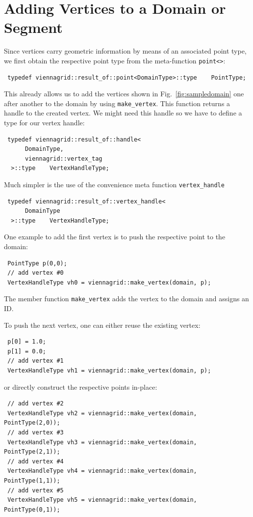 \pagebreak

\section{Adding Vertices to a Domain or Segment}
Since vertices carry geometric information by means of an associated point type, we first obtain the respective point type from the meta-function \lstinline|point<>|:
\begin{lstlisting}
 typedef viennagrid::result_of::point<DomainType>::type    PointType;
\end{lstlisting}
This already allows us to add the vertices shown in Fig.~\ref{fig:sampledomain} one after another to the domain by using \lstinline|make_vertex|. This function returns a handle to the created vertex. We might need this handle so we have to define a type for our vertex handle:
\begin{lstlisting}
 typedef viennagrid::result_of::handle<
      DomainType,
      viennagrid::vertex_tag
  >::type    VertexHandleType;
\end{lstlisting}
Much simpler is the use of the convenience meta function \lstinline|vertex_handle|
\begin{lstlisting}
 typedef viennagrid::result_of::vertex_handle<
      DomainType
  >::type    VertexHandleType;
\end{lstlisting}
One example to add the first vertex is to push the respective point to the domain:
\begin{lstlisting}
 PointType p(0,0);
 // add vertex #0
 VertexHandleType vh0 = viennagrid::make_vertex(domain, p);
\end{lstlisting}
The member function \lstinline|make_vertex| adds the vertex to the domain and assigns an ID.

To push the next vertex, one can either reuse the existing vertex:
\begin{lstlisting}
 p[0] = 1.0;
 p[1] = 0.0;
 // add vertex #1
 VertexHandleType vh1 = viennagrid::make_vertex(domain, p);
\end{lstlisting}

\pagebreak

or directly construct the respective points in-place:
\begin{lstlisting}
 // add vertex #2
 VertexHandleType vh2 = viennagrid::make_vertex(domain, PointType(2,0));
 // add vertex #3
 VertexHandleType vh3 = viennagrid::make_vertex(domain, PointType(2,1));
 // add vertex #4
 VertexHandleType vh4 = viennagrid::make_vertex(domain, PointType(1,1));
 // add vertex #5
 VertexHandleType vh5 = viennagrid::make_vertex(domain, PointType(0,1));
\end{lstlisting}

